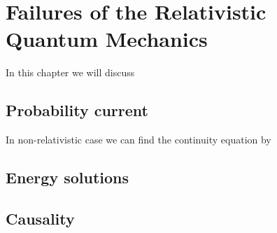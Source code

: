 \chapter{Failures of the Relativistic Quantum Mechanics}

In this chapter we will discuss 

\section{Probability current}

In non-relativistic case we can find the continuity equation by

\section{Energy solutions}

\section{Causality}
